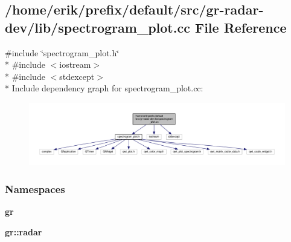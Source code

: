 \subsection{/home/erik/prefix/default/src/gr-\/radar-\/dev/lib/spectrogram\+\_\+plot.cc File Reference}
\label{spectrogram__plot_8cc}
{\ttfamily \#include \char`\"{}spectrogram\+\_\+plot.\+h\char`\"{}}\\*
{\ttfamily \#include $<$iostream$>$}\\*
{\ttfamily \#include $<$stdexcept$>$}\\*
Include dependency graph for spectrogram\+\_\+plot.\+cc\+:
\nopagebreak
\begin{figure}[H]
\begin{center}
\leavevmode
\includegraphics[width=350pt]{d2/d8d/spectrogram__plot_8cc__incl}
\end{center}
\end{figure}
\subsubsection*{Namespaces}
\begin{DoxyCompactItemize}
\item 
 {\bf gr}
\item 
 {\bf gr\+::radar}
\end{DoxyCompactItemize}
